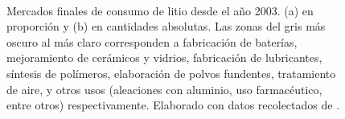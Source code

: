 \begin{figure}[htbp]
    \\%
    \caption[Series de tiempo mercados finales de consumo de litio desde el año 2003.]{Mercados finales de consumo de litio desde el año 2003. (a) en proporción y (b) en cantidades absolutas. Las zonas del gris más oscuro al más claro corresponden a fabricación de baterías, mejoramiento de cerámicos y vidrios, fabricación de lubricantes, síntesis de polímeros, elaboración de polvos fundentes, tratamiento de aire, y otros usos (aleaciones con aluminio, uso farmacéutico, entre otros) respectivamente.  Elaborado con datos recolectados de \citet{    SQM2003, SQM2004, SQM2005, SQM2006, SQM2007, SQM2008, SQM2009, USGS2011, USGS2012, USGS2013, USGS2014, USGS2015, USGS2016, USGS2017, USGS2018, USGS2019}.}
    \label{fig:uses}
\end{figure}

